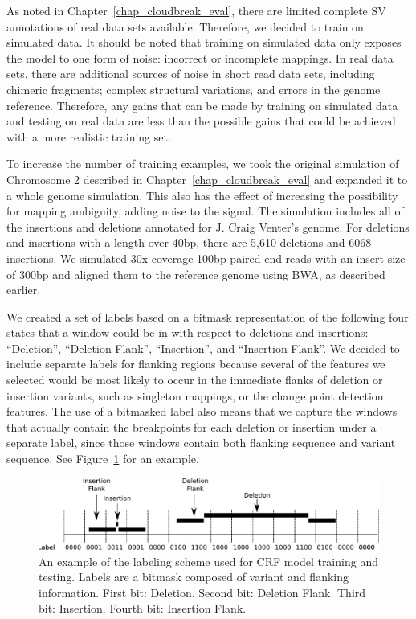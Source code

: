 As noted in Chapter~\ref{chap_cloudbreak_eval}, there are limited complete SV annotations of real data sets available. Therefore, we decided to train on simulated data. It should be noted that training on simulated data only exposes the model to one form of noise: incorrect or incomplete mappings. In real data sets, there are additional sources of noise in short read data sets, including chimeric fragments; complex structural variations, and errors in the genome reference. Therefore, any gains that can be made by training on simulated data and testing on real data are less than the possible gains that could be achieved with a more realistic training set.

To increase the number of training examples, we took the original simulation of Chromosome 2 described in Chapter~\ref{chap_cloudbreak_eval} and expanded it to a whole genome simulation. This also has the effect of increasing the possibility for mapping ambiguity, adding noise to the signal. The simulation includes all of the insertions and deletions annotated for J. Craig Venter's genome. For deletions and insertions with a length over 40bp, there are 5,610 deletions and 6068 insertions. We simulated 30x coverage 100bp paired-end reads with an insert size of 300bp and aligned them to the reference genome using BWA, as described earlier. 

We created a set of labels based on a bitmask representation of the following four states that a window could be in with respect to deletions and insertions: ``Deletion'', ``Deletion Flank'', ``Insertion'', and ``Insertion Flank''. We decided to include separate labels for flanking regions because several of the features we selected would be most likely to occur in the immediate flanks of deletion or insertion variants, such as singleton mappings, or the change point detection features. The use of a bitmasked label also means that we capture the windows that actually contain the breakpoints for each deletion or insertion under a separate label, since those windows contain both flanking sequence and variant sequence. See Figure~\ref{crf_labels} for an example.

\begin{figure}
\centering
\includegraphics[width=1\textwidth]{figures/crf_labelling.pdf}
\caption{An example of the labeling scheme used for CRF model training and testing. Labels are a bitmask composed of variant and flanking information. First bit: Deletion. Second bit: Deletion Flank. Third bit: Insertion. Fourth bit: Insertion Flank.}
\label{crf_labels}
\end{figure}

